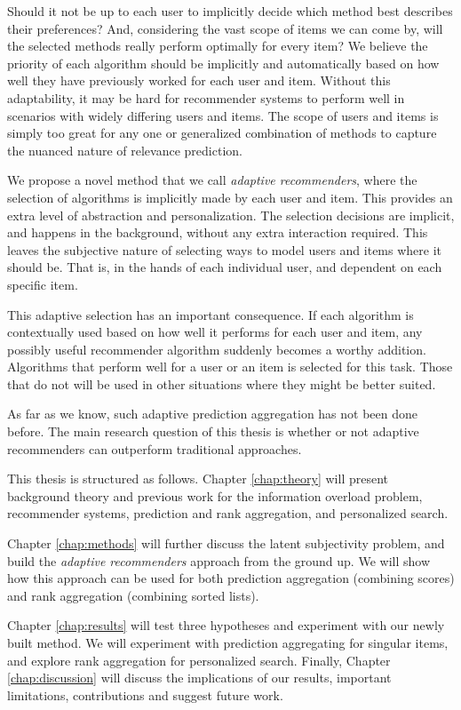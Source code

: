 Should it not be up to each user to implicitly decide which method best describes their preferences?
And, considering the vast scope of items we can come by, will the selected
methods really perform optimally for every item?
We believe the priority of each algorithm should be implicitly and automatically
based on how well they have previously worked for each user and item.
Without this adaptability, it may be hard for recommender systems
to perform well in scenarios with widely differing users and items.
The scope of users and items is simply too great for any one or generalized combination
of methods to capture the nuanced nature of relevance prediction.

We propose a novel method that we call \emph{adaptive recommenders}, 
where the selection of algorithms is implicitly made by each user and item.
This provides an extra level of abstraction and personalization.
The selection decisions are implicit, and happens in the background, without any extra interaction required.
This leaves the subjective nature of selecting ways to model users and items where it should be.
That is, in the hands of each individual user, and dependent on each specific item.

This adaptive selection has an important consequence. 
If each algorithm is contextually used based on how well it performs for each user and item,
any possibly useful recommender algorithm suddenly becomes a worthy addition.
Algorithms that perform well for a user or an item is selected for this task.
Those that do not will be used in other situations where they might be better suited.

As far as we know, such adaptive prediction aggregation has not been done before.
The main research question of this thesis is whether or not adaptive recommenders
can outperform traditional approaches.

\hr

\noindent
This thesis is structured as follows.
Chapter \ref{chap:theory} will present background theory and previous work for
the information overload problem, recommender systems, 
prediction and rank aggregation, and personalized search. 

Chapter \ref{chap:methods} will further discuss the latent subjectivity problem,
and build the \emph{adaptive recommenders} approach from the ground up.
We will show how this approach can be used for both prediction aggregation
(combining scores) and rank aggregation (combining sorted lists).

Chapter \ref{chap:results} will test three hypotheses and experiment with our newly built method.
We will experiment with prediction aggregating for singular items, and explore rank aggregation for personalized search.
Finally, Chapter \ref{chap:discussion} will discuss the implications of our results,
important limitations, contributions and suggest future work.

